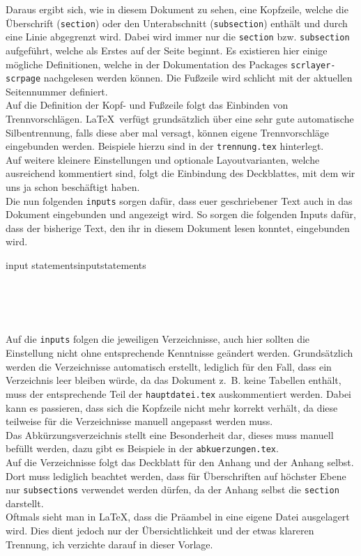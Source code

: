 Daraus ergibt sich, wie in diesem Dokument zu sehen, eine Kopfzeile, welche die
Überschrift (\texttt{section}) oder den Unterabschnitt (\texttt{subsection})
enthält und durch eine Linie abgegrenzt wird. Dabei wird immer nur die
\texttt{section} bzw. \texttt{subsection} aufgeführt, welche als Erstes auf der
Seite beginnt. Es existieren hier einige mögliche Definitionen, welche
in der Dokumentation des Packages \texttt{scrlayer-scrpage} nachgelesen werden
können. Die Fußzeile wird schlicht mit der aktuellen Seitennummer definiert.\\
Auf die Definition der Kopf- und Fußzeile folgt das Einbinden von
Trennvorschlägen. \LaTeX~verfügt grundsätzlich über eine sehr gute automatische
Silbentrennung, falls diese aber mal versagt, können eigene Trennvorschläge
eingebunden werden. Beispiele hierzu sind in der \texttt{trennung.tex}
hinterlegt.\\ Auf weitere kleinere Einstellungen und optionale Layoutvarianten,
welche ausreichend kommentiert sind, folgt die Einbindung des Deckblattes, mit
dem wir uns ja schon beschäftigt haben.\\ Die nun folgenden \texttt{inputs}
sorgen dafür, dass euer geschriebener Text auch in das Dokument eingebunden und
angezeigt wird. So sorgen die folgenden Inputs dafür, dass der bisherige Text,
den ihr in diesem Dokument lesen konntet, eingebunden wird.
\pagebreak
\begin{code}{input statements}{inputstatements}
	\begin{verbatim}
	
	
	
	\end{verbatim}
\end{code}
Auf die \texttt{inputs} folgen die jeweiligen Verzeichnisse, auch hier sollten
die Einstellung nicht ohne entsprechende Kenntnisse geändert werden. Grundsätzlich
werden die Verzeichnisse automatisch erstellt, lediglich für den Fall, dass ein
Verzeichnis leer bleiben würde, da das Dokument z. B. keine Tabellen enthält,
muss der entsprechende Teil der \texttt{hauptdatei.tex} auskommentiert werden.
Dabei kann es passieren, dass sich die Kopfzeile nicht mehr korrekt verhält, da
diese teilweise für die Verzeichnisse manuell angepasst werden muss.\\ Das
Abkürzungsverzeichnis stellt eine Besonderheit dar, dieses muss manuell befüllt
werden, dazu gibt es Beispiele in der \texttt{abkuerzungen.tex}.\\ Auf die
Verzeichnisse folgt das Deckblatt für den Anhang und der Anhang selbst. Dort
muss lediglich beachtet werden, dass für Überschriften auf höchster Ebene nur
\texttt{subsections} verwendet werden dürfen, da der Anhang selbst die
\texttt{section} darstellt.\\ Oftmals sieht man in \LaTeX, dass die Präambel in
eine eigene Datei ausgelagert wird. Dies dient jedoch nur der Übersichtlichkeit
und der etwas klareren Trennung, ich verzichte darauf in dieser Vorlage.
